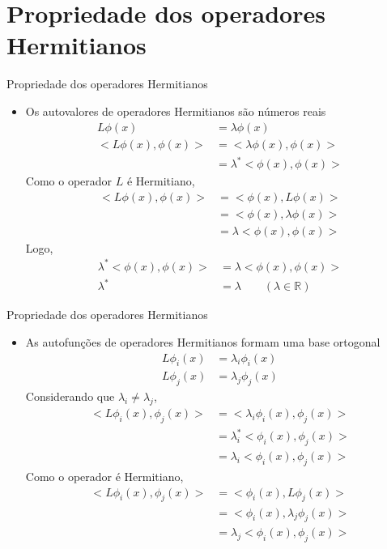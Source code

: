    \section[ slide = true ]{Propriedade dos operadores Hermitianos}
   \begin{slide}[toc=]{Propriedade dos operadores Hermitianos}
	   \begin{itemize}
		   \item Os autovalores de operadores Hermitianos são números reais
			   \begin{align*}
				   L\phi(x) &= \lambda \phi(x)\\
				   <L\phi(x), \phi(x)> &= <\lambda \phi(x),\phi(x)>\\
				                       &= \lambda^\ast <\phi(x),\phi(x)>
			   \end{align*}
			   Como o operador $L$ é Hermitiano,
			   \begin{align*}
				   <L\phi(x),\phi(x)> &= <\phi(x),L\phi(x)>\\
				                      &= <\phi(x),\lambda \phi(x)>\\
						      &= \lambda <\phi(x),\phi(x)>
			   \end{align*}
			   Logo,
			   \begin{align*}
				   \lambda^\ast<\phi(x),\phi(x)> &= \lambda<\phi(x),\phi(x)>\\
				   \lambda^\ast &= \lambda\qquad (\lambda \in \mathbb R)
			   \end{align*}
	   \end{itemize}
   \end{slide}
   
   \begin{slide}[toc=]{Propriedade dos operadores Hermitianos}
	   \begin{itemize}
		   \item As autofunções de operadores Hermitianos formam uma base ortogonal
			   \begin{align*}
				   L\phi_i(x) &= \lambda_i \phi_i(x)\\
				   L\phi_j(x) &= \lambda_j \phi_j(x)
			   \end{align*}
			   Considerando que $\lambda_i  \neq \lambda_j$, 
			   \begin{align*}
				   <L\phi_i(x),\phi_j(x)> &= <\lambda_i \phi_i(x),\phi_j(x)>\\
				                          &= \lambda_i^\ast<\phi_i(x),\phi_j(x)>\\
							  &= \lambda_i<\phi_i(x),\phi_j(x)>
			   \end{align*}
			   Como o operador é Hermitiano,
			   \begin{align*}
				   <L\phi_i(x),\phi_j(x)> &= <\phi_i(x),L\phi_j(x)>\\
				                          &= <\phi_i(x),\lambda_j \phi_j(x)>\\
							  &= \lambda_j<\phi_i(x),\phi_j(x)>
			   \end{align*}
	   \end{itemize}
   \end{slide}

